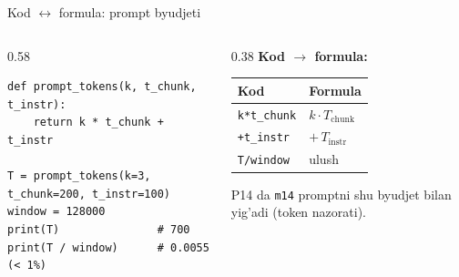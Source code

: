 \documentclass[aspectratio=169,11pt]{beamer}
\begin{document}
\begin{frame}[fragile]{Kod $\leftrightarrow$ formula: prompt byudjeti}
  \begin{columns}[T]
    \begin{column}{0.58\textwidth}
\begin{lstlisting}
def prompt_tokens(k, t_chunk, t_instr):
    return k * t_chunk + t_instr

T = prompt_tokens(k=3, t_chunk=200, t_instr=100)
window = 128000
print(T)               # 700
print(T / window)      # 0.0055 (< 1%)
\end{lstlisting}
    \end{column}
    \begin{column}{0.38\textwidth}
      \textbf{Kod $\to$ formula:}\\[3pt]
      \footnotesize
      \begin{tabular}{p{1.8cm}p{2.0cm}}
        \toprule
        Kod & Formula \\
        \midrule
        \texttt{k*t\_chunk} & $k\cdot T_{\text{chunk}}$ \\
        \texttt{+t\_instr} & $+\,T_{\text{instr}}$ \\
        \texttt{T/window} & ulush \\
        \bottomrule
      \end{tabular}
      \vspace{4pt}
      \begin{tcolorbox}[okbox,top=2pt,bottom=2pt]
        \footnotesize
        P14 da \texttt{m14} promptni shu byudjet bilan yig'adi (token nazorati).
      \end{tcolorbox}
    \end{column}
  \end{columns}
\end{frame}
\end{document}

